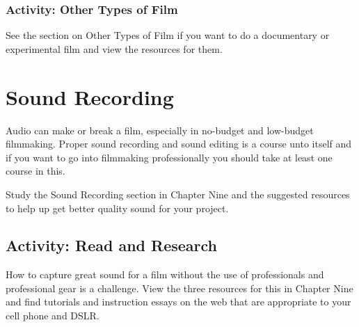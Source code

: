 \documentclass[
  letterpaper,
  DIV=11,
  numbers=noendperiod]{scrreprt}
\begin{document}
\subsubsection{Activity: Other Types of
Film}\label{activity-other-types-of-film}

\begin{tcolorbox}[enhanced jigsaw, opacityback=0, colframe=quarto-callout-note-color-frame, leftrule=.75mm, arc=.35mm, rightrule=.15mm, colbacktitle=quarto-callout-note-color!10!white, titlerule=0mm, colback=white, toprule=.15mm, bottomtitle=1mm, breakable, toptitle=1mm, title={Learning Activity}, coltitle=black, bottomrule=.15mm, left=2mm, opacitybacktitle=0.6]

See the section on Other Types of Film if you want to do a documentary
or experimental film and view the resources for them.

\end{tcolorbox}

\section{Sound Recording}\label{sound-recording}

Audio can make or break a film, especially in no-budget and low-budget
filmmaking. Proper sound recording and sound editing is a course unto
itself and if you want to go into filmmaking professionally you should
take at least one course in this.

Study the Sound Recording section in Chapter Nine and the suggested
resources to help up get better quality sound for your project.

\subsection{Activity: Read and
Research}\label{activity-read-and-research}

\begin{tcolorbox}[enhanced jigsaw, opacityback=0, colframe=quarto-callout-note-color-frame, leftrule=.75mm, arc=.35mm, rightrule=.15mm, colbacktitle=quarto-callout-note-color!10!white, titlerule=0mm, colback=white, toprule=.15mm, bottomtitle=1mm, breakable, toptitle=1mm, title={Learning Activity}, coltitle=black, bottomrule=.15mm, left=2mm, opacitybacktitle=0.6]

How to capture great sound for a film without the use of professionals
and professional gear is a challenge. View the three resources for this
in Chapter Nine and find tutorials and instruction essays on the web
that are appropriate to your cell phone and DSLR.

\end{tcolorbox}
\end{document}
